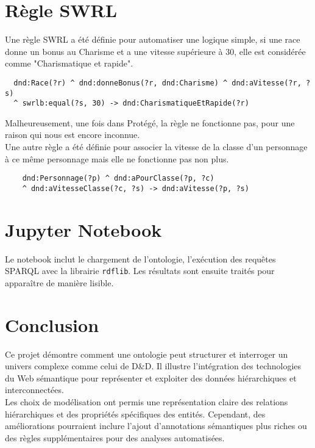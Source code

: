 \documentclass{article}
\newcommand{\cmd}[1]{\texttt{#1}}
\begin{document}
\section{Règle SWRL}

Une règle SWRL a été définie pour automatiser une logique simple, si une race donne un bonus au Charisme et a une vitesse supérieure à 30, elle est considérée comme "Charismatique et rapide".

\begin{lstlisting}
  dnd:Race(?r) ^ dnd:donneBonus(?r, dnd:Charisme) ^ dnd:aVitesse(?r, ?s)
  ^ swrlb:equal(?s, 30) -> dnd:CharismatiqueEtRapide(?r)
\end{lstlisting}

Malheureusement, une fois dans Protégé, la règle ne fonctionne pas, pour une raison qui nous est encore inconnue.\\

Une autre règle a été définie pour associer la vitesse de la classe d'un personnage à ce même personnage mais elle ne fonctionne pas non plus.

\begin{lstlisting}
	dnd:Personnage(?p) ^ dnd:aPourClasse(?p, ?c)
	^ dnd:aVitesseClasse(?c, ?s) -> dnd:aVitesse(?p, ?s)
\end{lstlisting}



\section{Jupyter Notebook}

Le notebook inclut le chargement de l'ontologie, l'exécution des requêtes SPARQL avec la librairie \cmd{rdflib}. Les résultats sont ensuite traités pour apparaître de manière lisible.

\section{Conclusion}

Ce projet démontre comment une ontologie peut structurer et interroger un univers complexe comme celui de D\&D. Il illustre l'intégration des technologies du Web sémantique pour représenter et exploiter des données hiérarchiques et interconnectées.\\

Les choix de modélisation ont permis une représentation claire des relations hiérarchiques et des propriétés spécifiques des entités. Cependant, des améliorations pourraient inclure l'ajout d'annotations sémantiques plus riches ou des règles supplémentaires pour des analyses automatisées.
\end{document}
